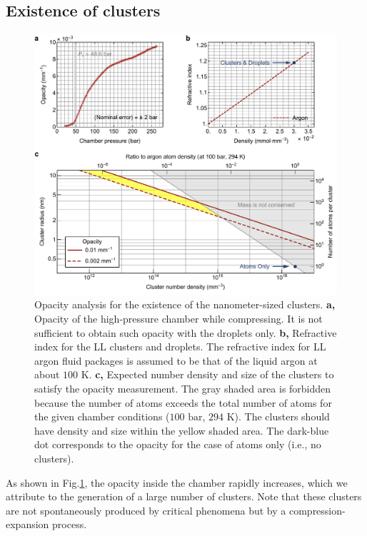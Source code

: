 \subsection{Existence of clusters}
\label{sec:ch2-3-4}

\begin{figure}[ht!]
\centering
\includegraphics[width=130mm]{figures/ch2/cluster/opacity.pdf}
\caption{Opacity analysis for the existence of the nanometer-sized clusters. \textbf{a,} Opacity of the high-pressure chamber while compressing. It is not sufficient to obtain such opacity with the droplets only. \textbf{b,} Refractive index for the LL clusters and droplets. The refractive index for LL argon fluid packages is assumed to be that of the liquid argon at about $100 \text{ K}$. \textbf{c,} Expected number density and size of the clusters to satisfy the opacity measurement. The gray shaded area is forbidden because the number of atoms exceeds the total number of atoms for the given chamber conditions ($100 \text{ bar}$, $294 \text{ K}$). The clusters should have density and size within the yellow shaded area. The dark-blue dot corresponds to the opacity for the case of atoms only (i.e., no clusters).}
\label{fig:opacity}
\end{figure}

As shown in Fig.\ref{fig:opacity}, the opacity inside the chamber rapidly increases, which we attribute to the generation of a large number of clusters. Note that these clusters are not spontaneously produced by critical phenomena but by a compression-expansion process.

